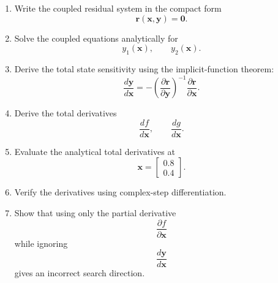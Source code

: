 \begin{enumerate}
    \item Write the coupled residual system in the compact form
    \begin{equation}
    \mathbf{r}
    \left(
    \mathbf{x},
    \mathbf{y}
    \right)
    =
    \mathbf{0}.
    \end{equation}

    \item Solve the coupled equations analytically for
    \begin{equation}
    y_1(\mathbf{x}),
    \qquad
    y_2(\mathbf{x}).
    \end{equation}

    \item Derive the total state sensitivity using the implicit-function
    theorem:
    \begin{equation}
    \frac{d\mathbf{y}}{d\mathbf{x}}
    =
    -
    \left(
    \frac{\partial\mathbf{r}}{\partial\mathbf{y}}
    \right)^{-1}
    \frac{\partial\mathbf{r}}{\partial\mathbf{x}}.
    \end{equation}

    \item Derive the total derivatives
    \begin{equation}
    \frac{df}{d\mathbf{x}},
    \qquad
    \frac{dg}{d\mathbf{x}}.
    \end{equation}

    \item Evaluate the analytical total derivatives at
    \begin{equation}
    \mathbf{x}
    =
    \begin{bmatrix}
    0.8\\0.4
    \end{bmatrix}.
    \end{equation}

    \item Verify the derivatives using complex-step differentiation.

    \item Show that using only the partial derivative
    \begin{equation}
    \frac{\partial f}{\partial\mathbf{x}}
    \end{equation}
    while ignoring
    \begin{equation}
    \frac{d\mathbf{y}}{d\mathbf{x}}
    \end{equation}
    gives an incorrect search direction.


\end{enumerate}
